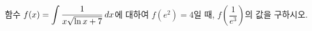 함수 $f(x)=\displaystyle\int\dfrac{1}{x\sqrt{\ln x+7}}\mkern3mu dx$에 대하여 $f(e^2)=4$일 때, $f\!\left(\dfrac{1}{e^3}\right)$의 값을 구하시오.
